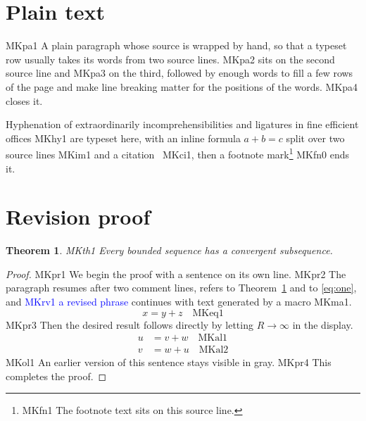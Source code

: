 \documentclass{article}
\newenvironment{REV}{\color{red}}{\ignorespacesafterend}
\newenvironment{OLD}{\color{gray}}{\ignorespacesafterend}
\newcommand{\rev}[1]{\textcolor{blue}{#1}}
\newcommand{\phrase}{text generated by a macro}
\newtheorem{theorem}{Theorem}
\begin{document}
\section{Plain text}
MKpa1 A plain paragraph whose source is wrapped by hand, so that a typeset row
usually takes its words from two source lines. MKpa2 sits on the second source line
and MKpa3 on the third, followed by enough words to fill a few rows of the page and
make line breaking matter for the positions of the words. MKpa4 closes it.

Hyphenation of extraordinarily incomprehensibilities and ligatures in fine efficient
offices MKhy1 are typeset here, with an inline formula $a + b
= c$ split over two source lines MKim1 and a citation~\cite{ref} MKci1, then a
footnote mark\footnote{MKfn1 The footnote text sits on this source line.} MKfn0 ends it.

\section{Revision proof}
\begin{theorem}\label{thm:main}
MKth1 Every bounded sequence has a convergent subsequence.
\end{theorem}
\begin{REV}
\begin{proof}
MKpr1 We begin the proof with a sentence on its own line.
MKpr2 The paragraph resumes after two comment lines, refers to Theorem~\ref{thm:main}
and to \eqref{eq:one}, and \rev{MKrv1 a revised phrase} continues with \phrase{} MKma1.
\begin{equation}\label{eq:one}
  x = y + z \quad\text{MKeq1}
\end{equation}
MKpr3 Then the desired result follows directly by letting $R \to \infty$ in the display.
\begin{align*}
  u &= v + w \quad\text{MKal1} \\
  v &= w + u \quad\text{MKal2}
\end{align*}
\begin{OLD}
MKol1 An earlier version of this sentence stays visible in gray.
\end{OLD}
MKpr4 This completes the proof.
\end{proof}
\end{REV}
\end{document}
